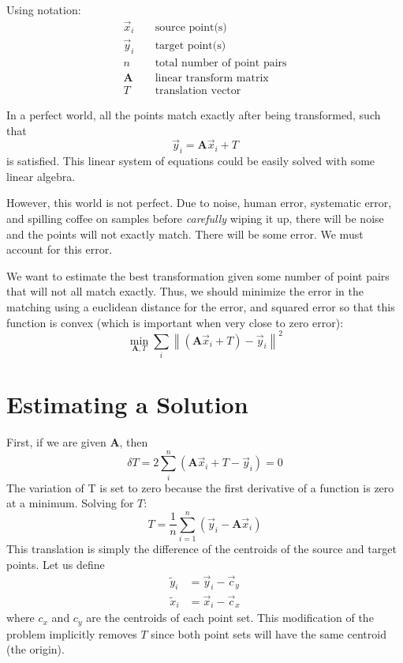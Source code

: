 Using notation:
\begin{align}
\vec{x}_i &\; &\text{source point(s)}\\
\vec{y}_i & &\text{target point(s)}\\
n && \text{total number of point pairs}\\
\mathbf{\mathbf{A}}& & \text{linear transform matrix}\\
T & &\text{translation vector}
\end{align}

In a perfect world, all the points match exactly after being transformed, such that 
\begin{equation}
\vec{y}_i = \mathbf{A} \vec{x}_i +T
\end{equation}
is satisfied. This linear system of equations could be easily solved with some linear algebra.

However, this world is not perfect. Due to noise, human error, systematic error, and spilling coffee on samples before \emph{carefully} wiping it up, there will be noise and the points will not exactly match. There will be some error. We must account for this error.

We want to estimate the best transformation given some number of point pairs that will not all match exactly. Thus, we should minimize the error in the matching using a euclidean distance for the error, and squared error so that this function is convex (which is important when very close to zero error):
\begin{equation}
\underset{\mathbf{A},T}{\min}\sum_i\left\|(\mathbf{A}\vec{x}_i + T) - \vec{y}_i\right\|^2
\end{equation}

\section{Estimating a Solution}

First, if we are given $\mathbf{A}$, then 
\begin{equation}
\delta T = 2 \sum_i^n \left(\mathbf{A}\vec{x}_i + T-\vec{y}_i\right) = 0
\end{equation}
The variation of T is set to zero because the first derivative of a function is zero at a minimum.
Solving for $T$:
\begin{equation}
T=\frac{1}{n}\sum_{i=1}^n \left(\vec{y}_i-\mathbf{A}\vec{x}_i\right)
\end{equation}
This translation is simply the difference of the centroids of the source and target points. Let us define
\begin{align}
\tilde{y}_i &= \vec{y}_i - \vec{c}_y\\
\tilde{x}_i &= \vec{x}_i - \vec{c}_x
\end{align}
where $c_x$ and $c_y$ are the centroids of each point set. This modification of the problem implicitly removes $T$ since both point sets will have the same centroid (the origin).

